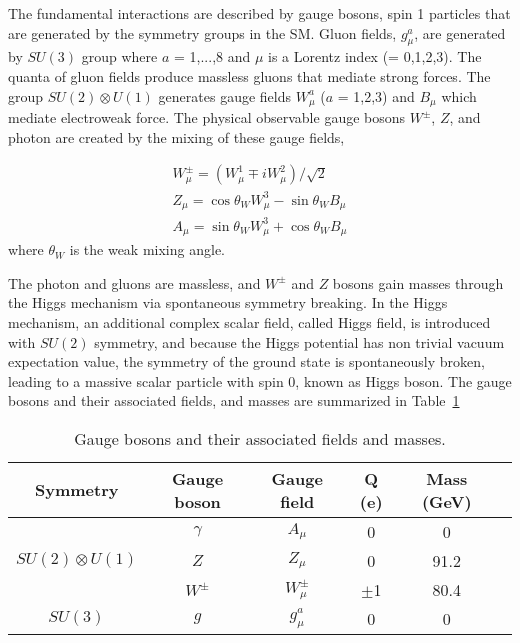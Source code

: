The fundamental interactions are described by gauge bosons, spin 1 particles that are generated by the symmetry groups in the SM. Gluon fields, $g^{a}_{\mu}$, are generated by $SU(3)$ group where $a$ = 1,...,8 and $\mu$ is a Lorentz index (= 0,1,2,3). The quanta of gluon fields produce massless gluons that mediate strong forces. The group $SU(2) \otimes U(1)$ generates gauge fields $W^{a}_{\mu}$ ($a$ = 1,2,3) and $B_{\mu}$ which mediate electroweak force. The physical observable gauge bosons $W^{\pm}$, $Z$, and photon are created by the mixing of these gauge fields, 

\begin{equation}
\label{eq:electroweak_mixing}
\begin{split}
	W^{\pm}_{\mu} = (W^{1}_{\mu} \mp iW^{2}_{\mu}) / \sqrt{2} \\
	Z_{\mu} = \cos \theta_{W} W^{3}_{\mu} - \sin\theta_{W} B_{\mu} \\
	A_{\mu} = \sin \theta_{W} W^{3}_{\mu} + \cos\theta_{W} B_{\mu}
\end{split}
\end{equation}
%
where $\theta_{W}$ is the weak mixing angle.

The photon and gluons are massless, and $W^{\pm}$ and $Z$ bosons gain masses through the Higgs mechanism via spontaneous symmetry breaking. In the Higgs mechanism, an additional complex scalar field, called Higgs field, is introduced with $SU(2)$ symmetry, and because the Higgs potential has non trivial vacuum expectation value, the symmetry of the ground state is spontaneously broken, leading to a massive scalar particle with spin 0, known as Higgs boson. The gauge bosons and their associated fields, and masses are summarized in Table~\ref{table:gauge_bosons}

\begin{table}[!htb]
  \centering
  \begin{tabular}{c c c c c c}
    \hline
    \hline
	Symmetry	& Gauge boson	& Gauge field	& Q (e) & Mass (GeV) \\
	\hline
	\multirow{3}{*}{$SU(2) \otimes U(1)$} & $\gamma$  &	$A_{\mu}$       & 0	   	& 0 	\\
										  & $Z$		  &	$Z_{\mu}$       & 0	   	& 91.2 	\\
										  & $W^{\pm}$ &	$W_{\mu}^{\pm}$ & $\pm$1  & 80.4 	\\
	\hline
	$SU(3)$								  & $g$		  &	$g^{a}_{\mu}$   &  0		& 0		\\

    \hline
    \hline
  \end{tabular}
  \caption{Gauge bosons and their associated fields and masses.}
  \label{table:gauge_bosons}
\end{table}


